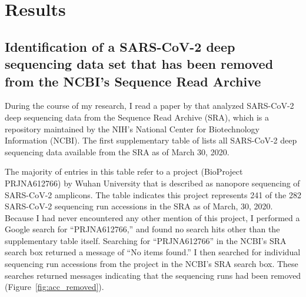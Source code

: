 \documentclass[9pt,twocolumn,twoside]{gsajnl_modified}
\begin{document}
\section{Results}

\subsection{Identification of a SARS-CoV-2 deep sequencing data set that has been removed from the NCBI's Sequence Read Archive}
During the course of my research, I read a paper by \citet{farkas2020insights} that analyzed SARS-CoV-2 deep sequencing data from the Sequence Read Archive (SRA), which is a repository maintained by the NIH's National Center for Biotechnology Information (NCBI).
The first supplementary table of \citet{farkas2020insights} lists all SARS-CoV-2 deep sequencing data available from the SRA as of March 30, 2020.

The majority of entries in this table refer to a project (BioProject PRJNA612766) by Wuhan University that is described as nanopore sequencing of SARS-CoV-2 amplicons.
The table indicates this project represents 241 of the 282 SARS-CoV-2 sequencing run accessions in the SRA as of March, 30, 2020.
Because I had never encountered any other mention of this project, I performed a Google search for ``PRJNA612766,'' and found no search hits other than the supplementary table itself.
Searching for ``PRJNA612766'' in the NCBI's SRA search box returned a message of ``No items found.''
I then searched for individual sequencing run accessions from the project in the NCBI's SRA search box.
These searches returned messages indicating that the sequencing runs had been removed (Figure~\ref{fig:acc_removed}).
\end{document}
